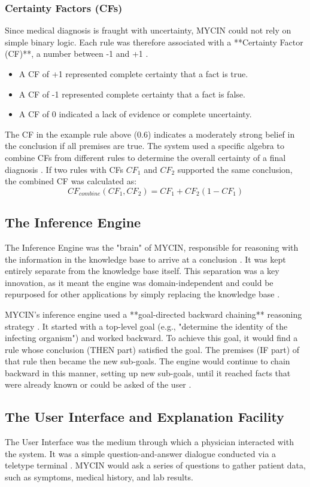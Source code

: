 \documentclass[conference]{IEEEtran}
\begin{document}
\subsubsection{Certainty Factors (CFs)}
Since medical diagnosis is fraught with uncertainty, MYCIN could not rely on simple binary logic. Each rule was therefore associated with a **Certainty Factor (CF)**, a number between -1 and +1 \cite{b23}.
\begin{itemize}
    \item A CF of +1 represented complete certainty that a fact is true.
    \item A CF of -1 represented complete certainty that a fact is false.
    \item A CF of 0 indicated a lack of evidence or complete uncertainty.
\end{itemize}
The CF in the example rule above (0.6) indicates a moderately strong belief in the conclusion if all premises are true. The system used a specific algebra to combine CFs from different rules to determine the overall certainty of a final diagnosis \cite{b20}. If two rules with CFs $CF_1$ and $CF_2$ supported the same conclusion, the combined CF was calculated as:
$$ CF_{combine}(CF_1, CF_2) = CF_1 + CF_2(1 - CF_1) $$

\subsection{The Inference Engine}
The Inference Engine was the "brain" of MYCIN, responsible for reasoning with the information in the knowledge base to arrive at a conclusion \cite{b24}. It was kept entirely separate from the knowledge base itself. This separation was a key innovation, as it meant the engine was domain-independent and could be repurposed for other applications by simply replacing the knowledge base \cite{b18}.

MYCIN's inference engine used a **goal-directed backward chaining** reasoning strategy \cite{b10}. It started with a top-level goal (e.g., "determine the identity of the infecting organism") and worked backward. To achieve this goal, it would find a rule whose conclusion (THEN part) satisfied the goal. The premises (IF part) of that rule then became the new sub-goals. The engine would continue to chain backward in this manner, setting up new sub-goals, until it reached facts that were already known or could be asked of the user \cite{b25}.

\subsection{The User Interface and Explanation Facility}
The User Interface was the medium through which a physician interacted with the system. It was a simple question-and-answer dialogue conducted via a teletype terminal \cite{b26}. MYCIN would ask a series of questions to gather patient data, such as symptoms, medical history, and lab results.
\end{document}
